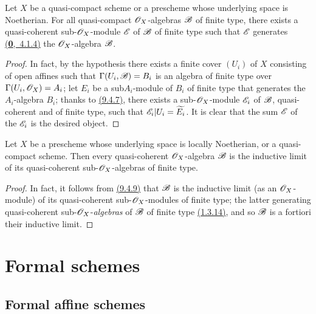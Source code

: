 \begin{prop}[9.6.5]
\label{prop-1.9.6.5}
Let $X$ be a quasi-compact scheme or a prescheme whose underlying space is Noetherian.
For all quasi-compact $\mathscr{O}_X$-algebras $\mathscr{B}$ of finite type, there exists a quasi-coherent sub-$\mathscr{O}_X$-module $\mathscr{E}$ of $\mathscr{B}$ of finite type such that $\mathscr{E}$ generates \hyperref[env-0.4.1.4]{(\textbf{0},~4.1.4)} the $\mathscr{O}_X$-algebra $\mathscr{B}$.
\end{prop}

\begin{proof}
\label{proof-prop-1.9.6.5}
In fact, by the hypothesis there exists a finite cover $(U_i)$ of $X$ consisting of open affines such that $\Gamma(U_i,\mathscr{B})=B_i$ is an algebra of finite type over $\Gamma(U_i,\mathscr{O}_X)=A_i$; let $E_i$ be a sub$A_i$-module of $B_i$ of finite type that generates the $A_i$-algebra $B_i$; thanks to \hyperref[thm-1.9.4.7]{(9.4.7)}, there exists a sub-$\mathscr{O}_X$-module $\mathscr{E}_i$ of $\mathscr{B}$, quasi-coherent and of finite type, such that $\mathscr{E}_i|U_i=\widetilde{E_i}$.
It is clear that the sum $\mathscr{E}$ of the $\mathscr{E}_i$ is the desired object.
\end{proof}

\begin{prop}[9.6.6]
\label{prop-1.9.6.6}
Let $X$ be a prescheme whose underlying space is locally Noetherian, or a quasi-compact scheme.
Then every quasi-coherent $\mathscr{O}_X$-algebra $\mathscr{B}$ is the inductive limit of its quasi-coherent sub-$\mathscr{O}_X$-algebras of finite type.
\end{prop}

\begin{proof}
\label{proof-prop-1.9.6.6}
In fact, it follows from \hyperref[cor-1.9.4.9]{(9.4.9)} that $\mathscr{B}$ is the inductive limit (as an $\mathscr{O}_X$-module) of its quasi-coherent sub-$\mathscr{O}_X$-modules of finite type; the latter generating quasi-coherent sub-$\mathscr{O}_X$-\emph{algebras} of $\mathscr{B}$ of finite type \hyperref[env-1.1.3.14]{(1.3.14)}, and so $\mathscr{B}$ is a fortiori their inductive limit.
\end{proof}

\section{Formal schemes}
\label{section-formal-schemes}

\subsection{Formal affine schemes}
\label{subsection-formal-affine-schemes}

